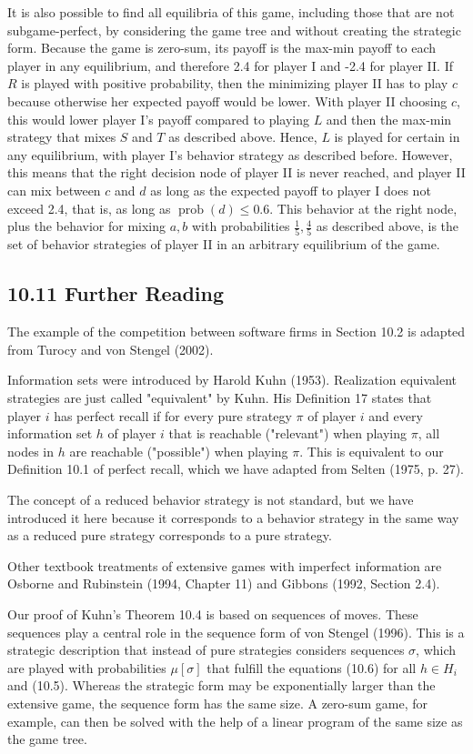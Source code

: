 \documentclass[12pt]{article}
\begin{document}
It is also possible to find all equilibria of this game, including those that are not subgame-perfect, by considering the game tree and without creating the strategic form. Because the game is zero-sum, its payoff is the max-min payoff to each player in any equilibrium, and therefore 2.4 for player I and -2.4 for player II. If $R$ is played with positive probability, then the minimizing player II has to play $c$ because otherwise her expected payoff would be lower. With player II choosing $c$, this would lower player I's payoff compared to playing $L$ and then the max-min strategy that mixes $S$ and $T$ as described above. Hence, $L$ is played for certain in any equilibrium, with player I's behavior strategy as described before. However, this means that the right decision node of player II is never reached, and player II can mix between $c$ and $d$ as long as the expected payoff to player I does not exceed 2.4, that is, as long as $\operatorname{prob}(d) \leq 0.6$. This behavior at the right node, plus the behavior for mixing $a, b$ with probabilities $\frac{1}{5}, \frac{4}{5}$ as described above, is the set of behavior strategies of player II in an arbitrary equilibrium of the game.

\subsection*{10.11 Further Reading}
The example of the competition between software firms in Section 10.2 is adapted from Turocy and von Stengel (2002).

Information sets were introduced by Harold Kuhn (1953). Realization equivalent strategies are just called "equivalent" by Kuhn. His Definition 17 states that player $i$ has perfect recall if for every pure strategy $\pi$ of player $i$ and every information set $h$ of player $i$ that is reachable ("relevant") when playing $\pi$, all nodes in $h$ are reachable ("possible") when playing $\pi$. This is equivalent to our Definition 10.1 of perfect recall, which we have adapted from Selten (1975, p. 27).

The concept of a reduced behavior strategy is not standard, but we have introduced it here because it corresponds to a behavior strategy in the same way as a reduced pure strategy corresponds to a pure strategy.

Other textbook treatments of extensive games with imperfect information are Osborne and Rubinstein (1994, Chapter 11) and Gibbons (1992, Section 2.4).

Our proof of Kuhn's Theorem 10.4 is based on sequences of moves. These sequences play a central role in the sequence form of von Stengel (1996). This is a strategic description that instead of pure strategies considers sequences $\sigma$, which\\
are played with probabilities $\mu[\sigma]$ that fulfill the equations (10.6) for all $h \in H_{i}$ and (10.5). Whereas the strategic form may be exponentially larger than the extensive game, the sequence form has the same size. A zero-sum game, for example, can then be solved with the help of a linear program of the same size as the game tree.
\end{document}

